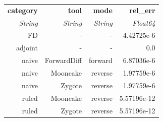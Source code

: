 \begin{tabular}{rrrr}
  \toprule
  \textbf{category} & \textbf{tool} & \textbf{mode} & \textbf{rel\_err} \\
  \textit{String} & \textit{String} & \textit{String} & \textit{Float64} \\
  \midrule
  FD & - & - & 4.42725e-6 \\
  adjoint & - & - & 0.0 \\
  naive & ForwardDiff & forward & 6.87036e-6 \\
  naive & Mooncake & reverse & 1.97759e-6 \\
  naive & Zygote & reverse & 1.97759e-6 \\
  ruled & Mooncake & reverse & 5.57196e-12 \\
  ruled & Zygote & reverse & 5.57196e-12 \\
  \bottomrule
\end{tabular}
